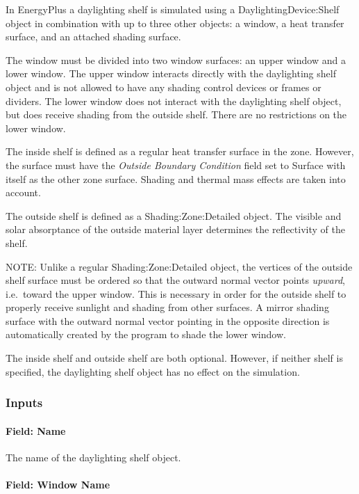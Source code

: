 In EnergyPlus a daylighting shelf is simulated using a DaylightingDevice:Shelf object in combination with up to three other objects: a window, a heat transfer surface, and an attached shading surface.

The window must be divided into two window surfaces: an upper window and a lower window. The upper window interacts directly with the daylighting shelf object and is not allowed to have any shading control devices or frames or dividers. The lower window does not interact with the daylighting shelf object, but does receive shading from the outside shelf. There are no restrictions on the lower window.

The inside shelf is defined as a regular heat transfer surface in the zone. However, the surface must have the \emph{Outside Boundary Condition} field set to Surface with itself as the other zone surface. Shading and thermal mass effects are taken into account.

The outside shelf is defined as a Shading:Zone:Detailed object. The visible and solar absorptance of the outside material layer determines the reflectivity of the shelf.

\begin{callout}
  NOTE: Unlike a regular Shading:Zone:Detailed object, the vertices of the outside shelf surface must be ordered so that the outward normal vector points \emph{upward}, i.e.~toward the upper window. This is necessary in order for the outside shelf to properly receive sunlight and shading from other surfaces. A mirror shading surface with the outward normal vector pointing in the opposite direction is automatically created by the program to shade the lower window.
\end{callout}

The inside shelf and outside shelf are both optional. However, if neither shelf is specified, the daylighting shelf object has no effect on the simulation.

\subsubsection{Inputs}\label{inputs-7-005}

\paragraph{Field: Name}\label{field-name-4-006}

The name of the daylighting shelf object.

\paragraph{Field: Window Name}\label{field-window-name-1}

